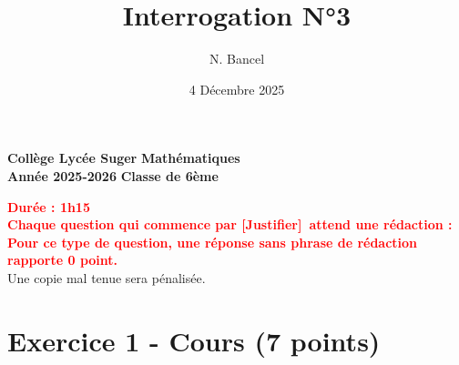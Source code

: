 \documentclass[answers]{exam}
\title{Interrogation N°3}
\author{N. Bancel}
\date{4 Décembre 2025}
\begin{document}
\textbf{Collège Lycée Suger}
\hfill
\textbf{Mathématiques} \\

\textbf{Année 2025-2026}
\hfill
\textbf{Classe de 6ème} \\

{\let\newpage\relax\maketitle}

\begin{center}
\textbf{\textcolor{red}{Durée : 1h15}} \\
\textbf{\textcolor{red}{Chaque question qui commence par [Justifier] attend une rédaction : \\
Pour ce type de question, une réponse sans phrase de rédaction rapporte 0 point.}} \\
Une copie mal tenue sera pénalisée.

\end{center}

\section*{Exercice 1 - Cours (7 points)}
\end{document}
